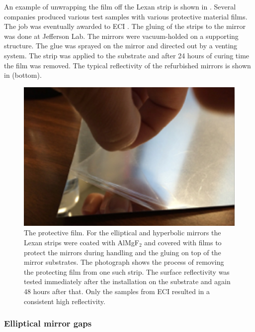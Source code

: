 An example of unwrapping the film off the Lexan strip is shown in . Several companies produced various test samples with
various protective material films. The job was eventually awarded to ECI \cite{ECI}.
The gluing of the strips to the mirror was done at Jefferson Lab. The mirrors were vacuum-holded on a supporting structure.
The glue was sprayed on the mirror and directed out by a venting system. The strip was applied to the substrate and after 24 hours
of curing time the film was removed.
The typical reflectivity of the refurbished mirrors is shown in  (bottom).


\begin{figure}
\centering
	\includegraphics[width=0.98\columnwidth, height=0.7\columnwidth]{img/filmOnStrip.png}
	\caption{The protective film. For the elliptical and hyperbolic mirrors the Lexan strips were coated with AlMgF$_2$
			 and covered with films to protect the mirrors during handling and the gluing on top of the mirror substrates.
             The photograph shows the process of removing the protecting film from one such strip.
             The surface reflectivity was tested immediately after the installation on the substrate and again 48 hours after that.
             Only the samples from ECI \cite{ECI} resulted in a consistent high reflectivity. }
	\label{fig:filmOnStrip}
\end{figure}


\subsubsection{Elliptical mirror gaps}

